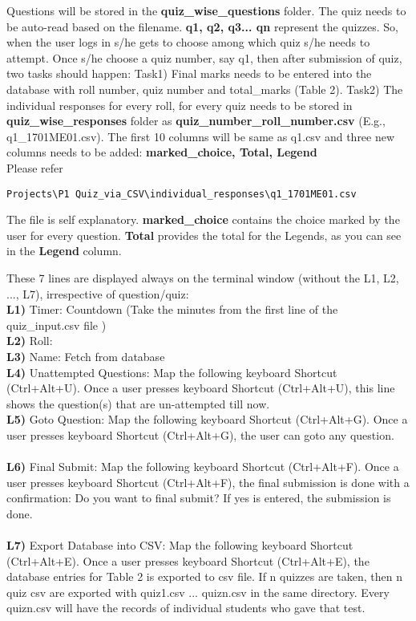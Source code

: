 \documentclass[12pt]{article}
\begin{document}
Questions will be stored in the \textbf{quiz\_wise\_questions} folder. The quiz needs to be auto-read based on the filename. \textbf{q1, q2, q3... qn} represent the quizzes. So, when the user logs in s/he gets to choose among which quiz  s/he needs to attempt. Once   s/he choose a quiz number, say q1, then after submission of quiz, two tasks should happen: Task1) Final marks needs to be entered into the database with roll number, quiz number and total\_marks (Table 2).  Task2) The individual responses for every roll, for every quiz needs to be stored in \textbf{quiz\_wise\_responses} folder as \textbf{quiz\_number\_roll\_number.csv} (E.g., q1\_1701ME01.csv). The first 10 columns will be same as q1.csv and three new columns needs to be added: \textbf{marked\_choice,	Total, Legend}\\
Please refer
\begin{verbatim}
Projects\P1 Quiz_via_CSV\individual_responses\q1_1701ME01.csv
\end{verbatim}
The file is self explanatory. \textbf{marked\_choice} contains the choice marked by the user for every question. \textbf{Total} provides the total for the Legends, as you can see in the \textbf{Legend} column. 


These 7 lines are displayed always on the terminal window (without the L1, L2, ..., L7), irrespective of question/quiz:\\
\textbf{L1) } Timer: Countdown (Take the minutes from the first line of the quiz\_input.csv file )\\
\textbf{L2) } Roll: \\
\textbf{L3) } Name: Fetch from database \\  
\textbf{L4) } Unattempted Questions: Map the following keyboard Shortcut (Ctrl+Alt+U). Once a user presses  keyboard Shortcut (Ctrl+Alt+U), this line shows the question(s) that are un-attempted till now.  \\
\textbf{L5) } Goto Question: Map the following keyboard Shortcut (Ctrl+Alt+G). Once a user presses  keyboard Shortcut (Ctrl+Alt+G), the user can goto any question.  \\
\\
\textbf{L6) } Final Submit: Map the following keyboard Shortcut (Ctrl+Alt+F). Once a user presses  keyboard Shortcut (Ctrl+Alt+F), the final submission is done with a confirmation: Do you want to final submit? If yes is entered, the submission is done.    \\
\\
\textbf{L7) } Export Database into CSV: Map the following keyboard Shortcut (Ctrl+Alt+E). Once a user presses  keyboard Shortcut (Ctrl+Alt+E), the database entries for Table 2 is exported to csv file. If n quizzes are taken, then n quiz csv are exported with quiz1.csv ... quizn.csv in the same directory. Every quizn.csv will have the records of individual students who gave that test.   \\
\end{document}
